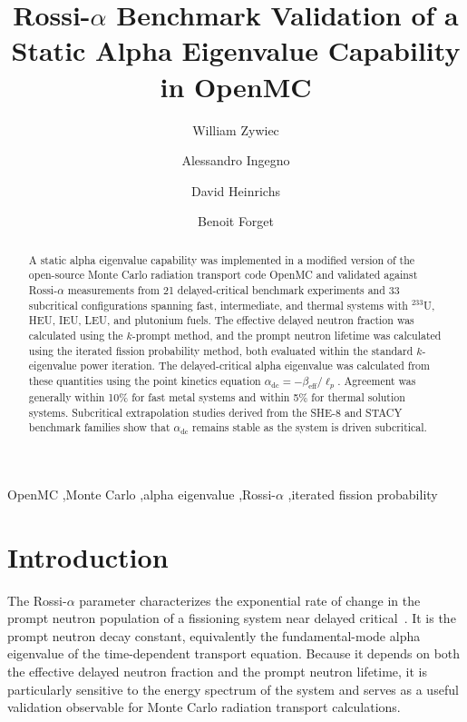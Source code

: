 \documentclass[12pt,preprint]{elsarticle}
\begin{document}
\begin{frontmatter}
\title{Rossi-$\alpha$ Benchmark Validation of a Static Alpha Eigenvalue Capability in OpenMC}
\author[llnl]{William Zywiec}
\author[llnl]{Alessandro Ingegno}
\author[llnl]{David Heinrichs}
\author[mit]{Benoit Forget}
\address[llnl]{Lawrence Livermore National Laboratory, Livermore, CA 94550, USA}
\address[mit]{Massachusetts Institute of Technology, Cambridge, MA 02139, USA}


\begin{abstract}
A static alpha eigenvalue capability was implemented in a modified version of the open-source Monte Carlo radiation transport code OpenMC and validated against Rossi-$\alpha$ measurements from 21 delayed-critical benchmark experiments and 33 subcritical configurations spanning fast, intermediate, and thermal systems with $^{233}$U, HEU, IEU, LEU, and plutonium fuels. The effective delayed neutron fraction was calculated using the $k$-prompt method, and the prompt neutron lifetime was calculated using the iterated fission probability method, both evaluated within the standard $k$-eigenvalue power iteration. The delayed-critical alpha eigenvalue was calculated from these quantities using the point kinetics equation $\alpha_{\mathrm{dc}} = -\beta_{\mathrm{eff}} / \ell_p$. Agreement was generally within 10\% for fast metal systems and within 5\% for thermal solution systems. Subcritical extrapolation studies derived from the SHE-8 and STACY benchmark families show that $\alpha_{\mathrm{dc}}$ remains stable as the system is driven subcritical.
\end{abstract}

\begin{keyword}
OpenMC \sep Monte Carlo \sep alpha eigenvalue \sep Rossi-$\alpha$ \sep iterated fission probability
\end{keyword}
\end{frontmatter}



\section{Introduction}\label{sec:intro}

The Rossi-$\alpha$ parameter characterizes the exponential rate of change in the prompt neutron population of a fissioning system near delayed critical~\cite{orndoff1957}. It is the prompt neutron decay constant, equivalently the fundamental-mode alpha eigenvalue of the time-dependent transport equation. Because it depends on both the effective delayed neutron fraction and the prompt neutron lifetime, it is particularly sensitive to the energy spectrum of the system and serves as a useful validation observable for Monte Carlo radiation transport calculations.
\end{document}
